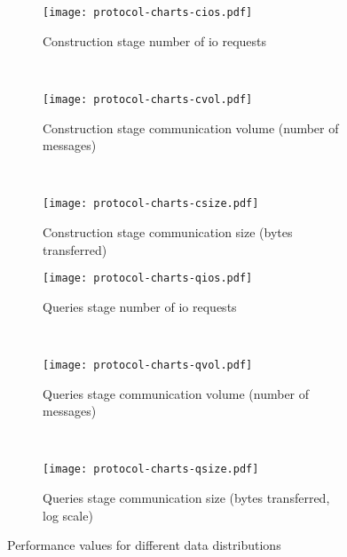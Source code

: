 \newlength{\hardcodedheight}
\newlength{\askip}
\newlength{\bskip}
\newlength{\blskip}

\setlength{\hardcodedheight}{135pt}
\setlength{\askip}{-10pt}
\setlength{\bskip}{0pt}
\setlength{\blskip}{-5pt}

\begin{figure*}[ht!]
	\captionsetup[subfigure]{justification=centering}
	\centering
	\begin{subfigure}[t]{0.333\textwidth}
		\centering
		\texttt{[image: protocol-charts-cios.pdf]}
		\setlength{\abovecaptionskip}{\askip}
		\setlength{\belowcaptionskip}{\bskip}
		\caption{Construction stage number of \acrshort{io} requests}\label{figure:protocols:cios}
	\end{subfigure}%
	~ %
	\begin{subfigure}[t]{0.333\textwidth}
		\centering
		\texttt{[image: protocol-charts-cvol.pdf]}
		\setlength{\abovecaptionskip}{\askip}
		\setlength{\belowcaptionskip}{\bskip}
		\caption{Construction stage communication volume (number of messages)}\label{figure:protocols:cvol}
	\end{subfigure}%
	~ %
	\begin{subfigure}[t]{0.333\textwidth}
		\centering
		\texttt{[image: protocol-charts-csize.pdf]}
		\setlength{\abovecaptionskip}{\askip}
		\setlength{\belowcaptionskip}{\bskip}
		\caption{Construction stage communication size (bytes transferred)}\label{figure:protocols:csize}
	\end{subfigure}%

	\begin{subfigure}[t]{0.333\textwidth}
		\centering
		\texttt{[image: protocol-charts-qios.pdf]}
		\setlength{\abovecaptionskip}{\askip}
		\setlength{\belowcaptionskip}{\blskip}
		\caption{Queries stage number of \acrshort{io} requests}\label{figure:protocols:qios}
	\end{subfigure}%
	~ %
	\begin{subfigure}[t]{0.333\textwidth}
		\centering
		\texttt{[image: protocol-charts-qvol.pdf]}
		\setlength{\abovecaptionskip}{\askip}
		\setlength{\belowcaptionskip}{\blskip}
		\caption{Queries stage communication volume (number of messages)}\label{figure:protocols:qvol}
	\end{subfigure}%
	~ %
	\begin{subfigure}[t]{0.333\textwidth}
		\centering
		\texttt{[image: protocol-charts-qsize.pdf]}
		\setlength{\abovecaptionskip}{\askip}
		\setlength{\belowcaptionskip}{\blskip}
		\caption{Queries stage communication size (bytes transferred, log scale)}\label{figure:protocols:qsize}
	\end{subfigure}%
	\caption{Performance values for different data distributions}\label{figure:protocols}
\end{figure*}
